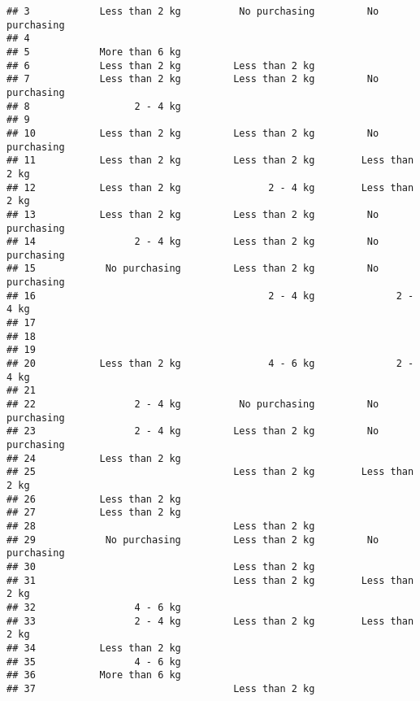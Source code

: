 \documentclass[
]{article}
\begin{document}
\begin{verbatim}
## 3            Less than 2 kg          No purchasing         No purchasing
## 4                                                                       
## 5            More than 6 kg                                             
## 6            Less than 2 kg         Less than 2 kg                      
## 7            Less than 2 kg         Less than 2 kg         No purchasing
## 8                  2 - 4 kg                                             
## 9                                                                       
## 10           Less than 2 kg         Less than 2 kg         No purchasing
## 11           Less than 2 kg         Less than 2 kg        Less than 2 kg
## 12           Less than 2 kg               2 - 4 kg        Less than 2 kg
## 13           Less than 2 kg         Less than 2 kg         No purchasing
## 14                 2 - 4 kg         Less than 2 kg         No purchasing
## 15            No purchasing         Less than 2 kg         No purchasing
## 16                                        2 - 4 kg              2 - 4 kg
## 17                                                                      
## 18                                                                      
## 19                                                                      
## 20           Less than 2 kg               4 - 6 kg              2 - 4 kg
## 21                                                                      
## 22                 2 - 4 kg          No purchasing         No purchasing
## 23                 2 - 4 kg         Less than 2 kg         No purchasing
## 24           Less than 2 kg                                             
## 25                                  Less than 2 kg        Less than 2 kg
## 26           Less than 2 kg                                             
## 27           Less than 2 kg                                             
## 28                                  Less than 2 kg                      
## 29            No purchasing         Less than 2 kg         No purchasing
## 30                                  Less than 2 kg                      
## 31                                  Less than 2 kg        Less than 2 kg
## 32                 4 - 6 kg                                             
## 33                 2 - 4 kg         Less than 2 kg        Less than 2 kg
## 34           Less than 2 kg                                             
## 35                 4 - 6 kg                                             
## 36           More than 6 kg                                             
## 37                                  Less than 2 kg                      

\end{verbatim}
\end{document}
